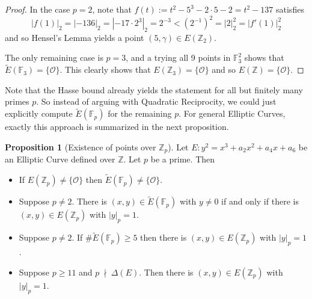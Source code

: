 \documentclass{scrartcl}
\newcommand{\Z}{\mathbb{Z}}
\newcommand{\F}{\mathbb{F}}
\renewcommand{\O}{\mathcal{O}}
\newcommand{\notdivides}{\ \nmid \ }
\theoremstyle{definition}
\newtheorem{prop}[subsection]{Proposition}
\begin{document}
\begin{proof}
    In the case $p = 2$, note that $f(t) := t^2 - 5^3 - 2 \cdot 5 - 2 = t^2 - 137$ satisfies
    \begin{equation*}
        |f(1)|_2 = |-136|_2 = |-17 \cdot 2^3|_2 = 2^{-3} < \left( 2^{-1} \right)^2 = |2|_2^2 = |f'(1)|_2^2
    \end{equation*}
    and so Hensel's Lemma \cite[Thm 2.14]{lecture} yields a point $(5, \gamma) \in E(\Z_2)$.

    The only remaining case is $p = 3$, and a trying all 9 points in $\F_3^2$ shows that $\tilde{E}(\F_3) = \{\O\}$.
    This clearly shows that $E(\Z_3) = \{ \O \}$ and so $E(\Z) = \{\O\}$.
\end{proof}
Note that the Hasse bound already yields the statement for all but finitely many primes $p$.
So instead of arguing with Quadratic Reciprocity, we could just explicitly compute $\tilde{E}(\F_p)$ for the remaining $p$.
For general Elliptic Curves, exactly this approach is summarized in the next proposition.
\begin{prop}[Existence of points over $\Z_p$]
    \label{prop:p_adic_points_techniques}
    Let $E: y^2 = x^3 + a_2 x^2 + a_4 x + a_6$ be an Elliptic Curve defined over $\Z$.
    Let $p$ be a prime.
    Then
    \begin{itemize}
        \item If $E(\Z_p) \neq \{\O\}$ then $\tilde{E}(\F_p) \neq \{\O\}$.
        \item Suppose $p \neq 2$. There is $(x, y) \in \tilde{E}(\F_p)$ with $y \neq 0$ if and only if there is $(x, y) \in E(\Z_p)$ with $|y|_p = 1$.
        \item Suppose $p \neq 2$. If $\#\tilde{E}(\F_p) \geq 5$ then there is $(x, y) \in E(\Z_p)$ with $|y|_p = 1$.
        \item Suppose $p \geq 11$ and $p \notdivides \Delta(E)$. Then there is $(x, y) \in E(\Z_p)$ with $|y|_p = 1$.
    \end{itemize}
\end{prop}
\end{document}
